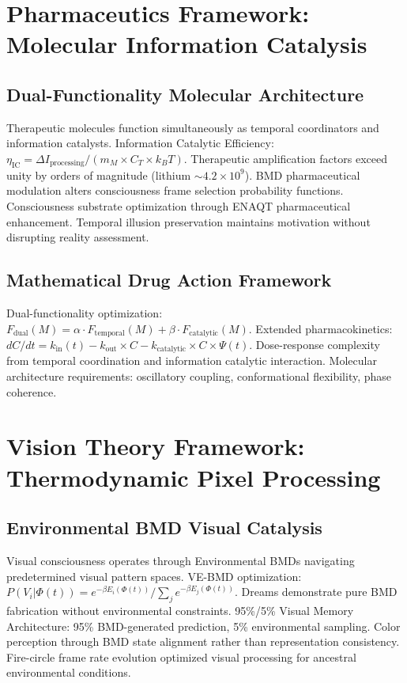\documentclass[12pt,a4paper]{article}
\begin{document}
\section{Pharmaceutics Framework: Molecular Information Catalysis}

\subsection{Dual-Functionality Molecular Architecture}

Therapeutic molecules function simultaneously as temporal coordinators and information catalysts. Information Catalytic Efficiency: $\eta_{\text{IC}} = \Delta I_{\text{processing}} / (m_M \times C_T \times k_B T)$. Therapeutic amplification factors exceed unity by orders of magnitude (lithium $\sim 4.2 \times 10^9$). BMD pharmaceutical modulation alters consciousness frame selection probability functions. Consciousness substrate optimization through ENAQT pharmaceutical enhancement. Temporal illusion preservation maintains motivation without disrupting reality assessment.

\subsection{Mathematical Drug Action Framework}

Dual-functionality optimization: $F_{\text{dual}}(M) = \alpha \cdot F_{\text{temporal}}(M) + \beta \cdot F_{\text{catalytic}}(M)$. Extended pharmacokinetics: $dC/dt = k_{\text{in}}(t) - k_{\text{out}} \times C - k_{\text{catalytic}} \times C \times \Psi(t)$. Dose-response complexity from temporal coordination and information catalytic interaction. Molecular architecture requirements: oscillatory coupling, conformational flexibility, phase coherence.

\section{Vision Theory Framework: Thermodynamic Pixel Processing}

\subsection{Environmental BMD Visual Catalysis}

Visual consciousness operates through Environmental BMDs navigating predetermined visual pattern spaces. VE-BMD optimization: $P(V_i | \Phi(t)) = e^{-\beta E_i(\Phi(t))} / \sum_j e^{-\beta E_j(\Phi(t))}$. Dreams demonstrate pure BMD fabrication without environmental constraints. 95\%/5\% Visual Memory Architecture: 95\% BMD-generated prediction, 5\% environmental sampling. Color perception through BMD state alignment rather than representation consistency. Fire-circle frame rate evolution optimized visual processing for ancestral environmental conditions.
\end{document}
